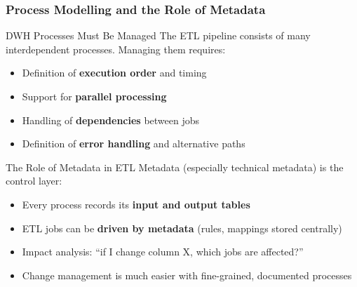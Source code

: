 \begin{frame}
  \frametitle{Process Modelling and the Role of Metadata}

  \begin{block}{DWH Processes Must Be Managed}
    The ETL pipeline consists of many interdependent processes.
    Managing them requires:
    \begin{itemize}
      \item Definition of \textbf{execution order} and timing
      \item Support for \textbf{parallel processing}
      \item Handling of \textbf{dependencies} between jobs
      \item Definition of \textbf{error handling} and alternative paths
    \end{itemize}
  \end{block}

  \begin{block}{The Role of Metadata in ETL}
    Metadata (especially technical metadata) is the control layer:
    \begin{itemize}
      \item Every process records its \textbf{input and output tables}
      \item ETL jobs can be \textbf{driven by metadata} (rules, mappings stored centrally)
      \item Impact analysis: ``if I change column X, which jobs are affected?''
      \item Change management is much easier with fine-grained, documented processes
    \end{itemize}
  \end{block}
\end{frame}


